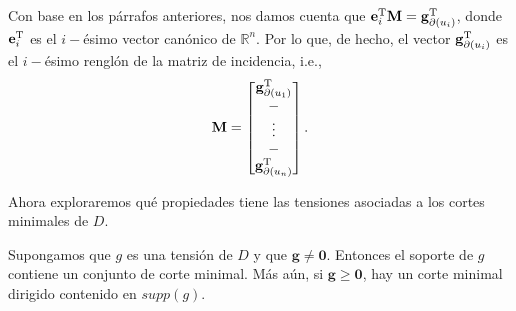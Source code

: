 Con base en los párrafos anteriores, nos damos cuenta que $\mathbf{e}^{\textnormal{T}}_{i}\mathbf{M} = \mathbf{g}^{\textnormal{T}}_{\partial({u_{i})}}$, donde $\mathbf{e}^{\textnormal{T}}_{i}$ es el $i-$ésimo vector canónico de $\mathbb{R}^{n}$. Por lo que, de hecho, el vector $\mathbf{g}^{\textnormal{T}}_{\partial{(u_{i})}}$ es el $i-$ésimo  renglón de la matriz de incidencia, i.e.,
$$
\mathbf{M} = \begin{bmatrix}
\mathbf{g}^{\textnormal{T}}_{\partial(u_{1})} \\
\-- \\
\vdots \\
\--\\
\mathbf{g}^{\textnormal{T}}_{\partial(u_{n})}
\end{bmatrix}.
$$

Ahora exploraremos qué propiedades tiene las tensiones asociadas a los cortes minimales de $D$.

\begin{lema}
Supongamos que $g$ es una tensión de $D$ y que $\mathbf{g} \neq \mathbf{0}$. Entonces el soporte de $g$ contiene un conjunto de corte minimal. Más aún, si $\mathbf{g} \geq \mathbf{0}$, hay un corte minimal dirigido contenido en $supp(g)$.
\end{lema}

